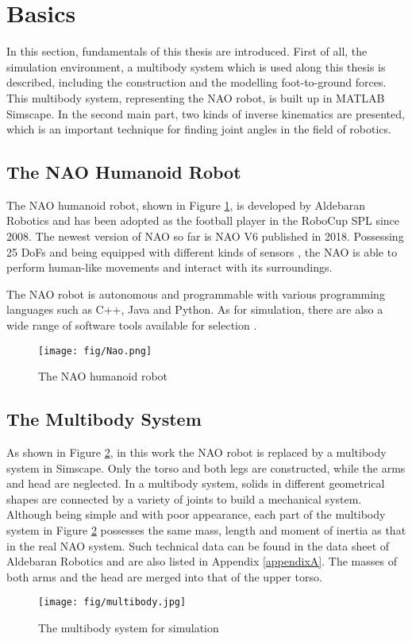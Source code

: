 \section {Basics}
\label{basics}
In this section, fundamentals of this thesis are introduced. First of all, the simulation environment, a multibody system which is used along this thesis is described, including the construction and the modelling foot-to-ground forces. This multibody system, representing the NAO robot, is built up in MATLAB Simscape. In the second main part, two kinds of inverse kinematics are presented, which is an important technique for finding joint angles in the field of robotics.

\subsection{The NAO Humanoid Robot}
The NAO humanoid robot, shown in Figure {\ref{NAO}}, is developed by Aldebaran Robotics and has been adopted as the football player in the RoboCup \ac{SPL} since 2008. The newest version of NAO so far is NAO V6 published in 2018. Possessing 25 \ac{DoFs} and being equipped with different kinds of sensors \cite{naosensorlist}, the NAO is able to perform human-like movements and interact with its surroundings.

The NAO robot is autonomous and programmable with various programming languages such as C++, Java and Python. As for simulation, there are also a wide range of software tools available for selection \cite{ivaldi2014tools}.
\begin{figure}[H]
	\centering
	\texttt{[image: fig/Nao.png]}
	\caption[The NAO humanoid]{The NAO humanoid robot \cite{Naopicture}}
	\label{NAO}
\end{figure} 

\subsection{The Multibody System}
As shown in Figure {\ref{multibody}}, in this work the NAO robot is replaced by a multibody system in Simscape. Only the torso and both legs are constructed, while the arms and head are neglected. In a multibody system, solids in different geometrical shapes are connected by a variety of joints to build a mechanical system. Although being simple and with poor appearance, each part of the multibody system in Figure {\ref{multibody}} possesses the same mass, length and moment of inertia as that in the real NAO system. Such technical data can be found in the data sheet of Aldebaran Robotics \cite{Naoparameter} and are also listed in Appendix {\ref{appendixA}}. The masses of both arms and the head are merged into that of the upper torso.
\begin{figure}[H]
	\centering
	\texttt{[image: fig/multibody.jpg]}
	\caption{The multibody system for simulation}
	\label{multibody}
\end{figure}

